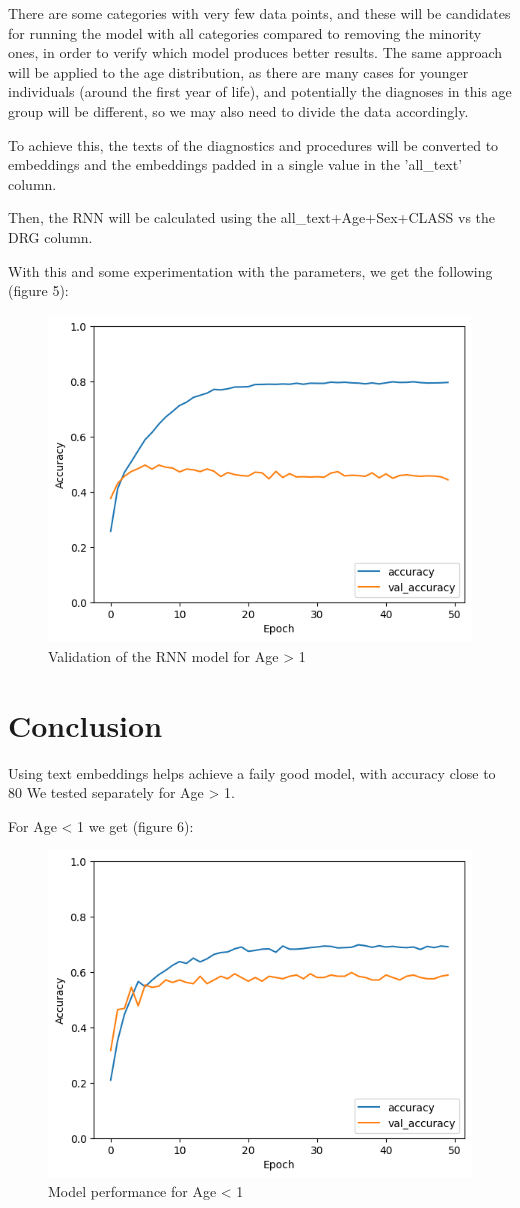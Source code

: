 \documentclass{ieeeaccess}
\begin{document}
There are some categories with very few data points, and these will be candidates for running the model with all categories compared to removing the minority ones, in order to verify which model produces better results. The same approach will be applied to the age distribution, as there are many cases for younger individuals (around the first year of life), and potentially the diagnoses in this age group will be different, so we may also need to divide the data accordingly.

To achieve this, the texts of the diagnostics and procedures will be converted to embeddings and the embeddings padded in a single value in the 'all\_text' column.

Then, the RNN will be calculated using the all\_text+Age+Sex+CLASS vs the DRG column.

With this and some experimentation with the parameters, we get the following (figure 5):

\begin{figure}
    \centering
    \includegraphics[width=0.5\linewidth]{image5.png}
    \caption{Validation of the RNN model for Age > 1}
    \label{fig:enter-label}
\end{figure}

\section{Conclusion}
\label{sec:conclusion}
Using text embeddings helps achieve a faily good model, with accuracy close to 80%
We tested separately for Age > 1.


For Age < 1 we get (figure 6):

\begin{figure}
    \centering
    \includegraphics[width=0.5\linewidth]{image6.png}
    \caption{Model performance for Age < 1}
    \label{fig:enter-label}
\end{figure}
\end{document}
